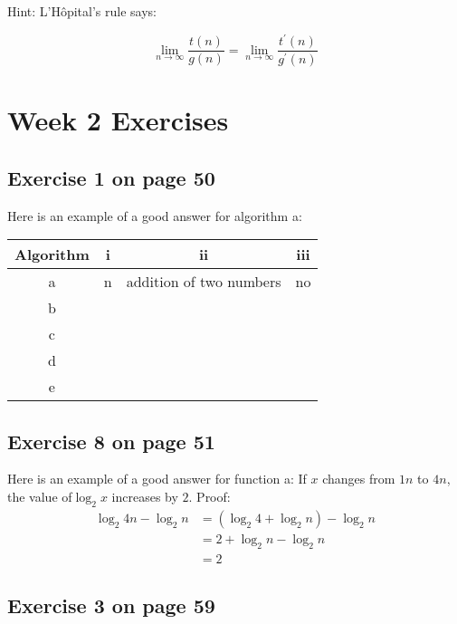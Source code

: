 \documentclass[12pt]{amsart}
\begin{document}
Hint: L'H\^{o}pital's rule says:

   \[\lim_{n \rightarrow \infty} \frac{t(n)}{g(n)} = \lim_{n \rightarrow \infty} \frac{t^{\prime}(n)}{g^{\prime}(n)}\]

\section{Week 2 Exercises}
\subsection{ Exercise 1 on page 50} $ $\\ 

Here is an example of a good answer for algorithm a:
  
  \begin{center}
\begin{tabular}{ |c|c|c|c| } 
 \hline
 \textbf{Algorithm} & \textbf{i} & \textbf{ii} & \textbf{iii} \\ 
 \hline
 a & n & addition of two numbers & no \\ 
 \hline
 b & & & \\ 
 \hline
 c & & & \\ 
 \hline
 d & & & \\
 \hline
 e & & & \\  
 \hline
\end{tabular}
\end{center}

\subsection{Exercise 8 on page 51} $ $\\ 

  Here is an example of a good answer for function a:
  If $x$ changes from $1n$ to $4n$, the value of$\log_2 x$ increases by $2$.
  Proof:
 \begin{align*}  
 \log_2 4n - \log_2 n &= (\log_2 4 + \log_2 n) - \log_2 n \\
 		&= 2 + \log_2 n - \log_2 n \\
 		&= 2
\end{align*}


  
\subsection{Exercise 3 on page 59} $ $\\ 
\end{document}
